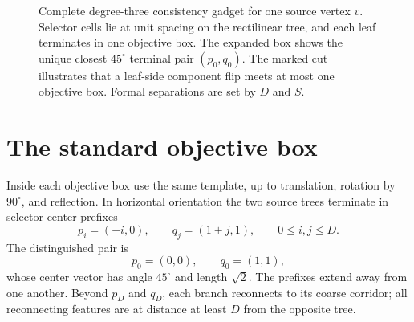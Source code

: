 \documentclass[12pt,a4paper]{article}
\begin{document}
\begin{figure}[htbp]
\caption{Complete degree-three consistency gadget for one source vertex $v$.  Selector cells lie at unit spacing on the rectilinear tree, and each leaf terminates in one objective box.  The expanded box shows the unique closest $45^\circ$ terminal pair $(p_0,q_0)$.  The marked cut illustrates that a leaf-side component flip meets at most one objective box.  Formal separations are set by $D$ and $S$.}
\label{fig:vertex-gadget}
\end{figure}

\section{The standard objective box}\label{sec:objective}

Inside each objective box use the same template, up to translation, rotation by $90^\circ$, and reflection.  In horizontal orientation the two source trees terminate in selector-center prefixes
\begin{equation}\label{eq:obj-rays}
 p_i=(-i,0),\qquad
 q_j=(1+j,1),
 \qquad 0\le i,j\le D.
\end{equation}
The distinguished pair is
\[
 p_0=(0,0),\qquad q_0=(1,1),
\]
whose center vector has angle $45^\circ$ and length $\sqrt2$.  The prefixes extend away from one another.  Beyond $p_D$ and $q_D$, each branch reconnects to its coarse corridor; all reconnecting features are at distance at least $D$ from the opposite tree.
\end{document}
